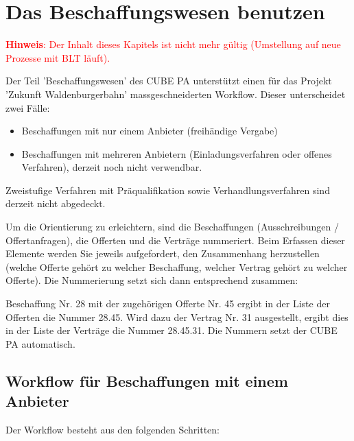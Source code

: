 
\clearpage
\section{Das Beschaffungswesen benutzen}

\textbf{\textcolor{red}{Hinweis}}\textcolor{red}{: Der Inhalt dieses Kapitels ist nicht mehr gültig (Umstellung auf neue Prozesse mit BLT läuft).}

\vspace{\baselineskip}

Der Teil 'Beschaffungswesen' des CUBE PA unterstützt einen für das Projekt 'Zukunft Waldenburgerbahn' massgeschneiderten Workflow. Dieser unterscheidet zwei Fälle:

\begin{itemize}
\item
Beschaffungen mit nur einem Anbieter (freihändige Vergabe)
\item
Beschaffungen mit mehreren Anbietern (Einladungsverfahren oder offenes Verfahren), derzeit noch nicht verwendbar.
\end{itemize}

Zweistufige Verfahren mit Präqualifikation sowie Verhandlungsverfahren sind derzeit nicht abgedeckt.

\vspace{\baselineskip}

Um die Orientierung zu erleichtern, sind die Beschaffungen (Ausschreibungen / Offertanfragen), die Offerten und die Verträge nummeriert. Beim Erfassen dieser Elemente werden Sie jeweils aufgefordert, den Zusammenhang herzustellen (welche Offerte gehört zu welcher Beschaffung, welcher Vertrag gehört zu welcher Offerte). Die Nummerierung setzt sich dann entsprechend zusammen:

\vspace{\baselineskip}

Beschaffung Nr. 28 mit der zugehörigen Offerte Nr. 45 ergibt in der Liste der Offerten die Nummer 28.45. Wird dazu der Vertrag Nr. 31 ausgestellt, ergibt dies in der Liste der Verträge die Nummer 28.45.31. Die Nummern setzt der CUBE PA automatisch.

\subsection{Workflow für Beschaffungen mit einem Anbieter}

Der Workflow besteht aus den folgenden Schritten:

